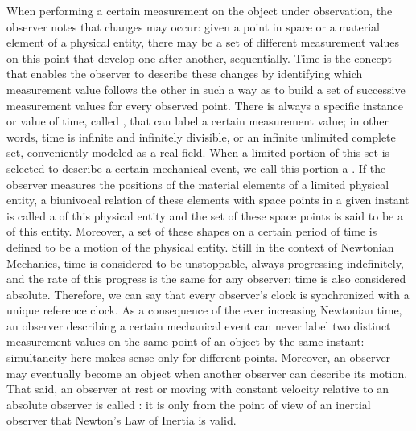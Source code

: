 When performing a certain measurement on the object under observation, the observer notes that changes may occur: given a point in space or a material element of a physical entity, there may be a set of different measurement values on this point that develop one after another, sequentially. Time is the concept that enables the observer to describe these changes by identifying which measurement value follows the other in such a way as to build a set of successive measurement values for every observed point.  There is always a specific instance or value of time, called , that can label a certain measurement value; in other words, time is infinite and infinitely divisible, or an infinite unlimited complete set, conveniently modeled as a real field. When a limited portion of this set is selected to describe a certain mechanical event, we call this portion a . If the observer measures the positions of the material elements of a limited physical entity, a biunivocal relation of these elements with space points in a given instant is called
a  of this physical entity and the set of these space points is said to be a  of this entity. Moreover, a set of these shapes on a certain period of time is defined to be a motion of the physical entity. Still in the context of Newtonian Mechanics, time is considered to be unstoppable, always progressing indefinitely, and the rate of this progress is the same for any observer: time is also considered absolute. Therefore, we can say that every observer's clock is synchronized with a unique reference clock. As a consequence of the ever increasing Newtonian time, an observer describing a certain mechanical event can never label two distinct measurement values on the same point of an object by the same instant: simultaneity here makes sense only for different points. Moreover, an observer may eventually become an object when another observer can describe its motion. That said, an observer at rest or moving with constant velocity relative to an absolute observer is called : it is only from the point of view of an inertial observer that Newton's Law of Inertia is valid.   

